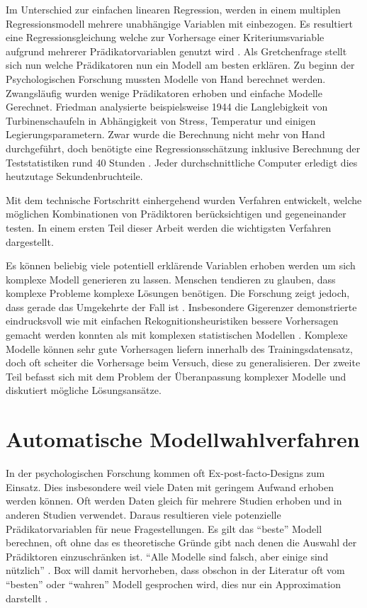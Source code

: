 \documentclass[english,12pt,doc]{apa}
\begin{document}
Im Unterschied zur einfachen linearen Regression, werden in einem multiplen Regressionsmodell mehrere unabhängige Variablen mit einbezogen. 
Es resultiert eine Regressionsgleichung welche zur Vorhersage einer Kriteriumsvariable aufgrund mehrerer Prädikatorvariablen genutzt wird  \cite[S. 448]{bortz2011}. 
Als Gretchenfrage stellt sich nun welche Prädikatoren nun ein Modell am besten erklären. 
Zu beginn der Psychologischen Forschung mussten Modelle von Hand berechnet werden. Zwangsläufig wurden wenige Prädikatoren erhoben und einfache Modelle Gerechnet. 
Friedman analysierte beispielsweise 1944 die Langlebigkeit von Turbinenschaufeln in Abhängigkeit von Stress, Temperatur und einigen Legierungsparametern. 
Zwar wurde die Berechnung nicht mehr von Hand durchgeführt, doch benötigte eine Regressionsschätzung inklusive Berechnung der Teststatistiken rund 40 Stunden \cite[p.2]{armstrong2011illusions}. Jeder durchschnittliche Computer erledigt dies heutzutage Sekundenbruchteile. 

Mit dem technische Fortschritt einhergehend wurden Verfahren entwickelt, welche möglichen Kombinationen von Prädiktoren berücksichtigen und gegeneinander testen. 
In einem ersten Teil dieser Arbeit werden die wichtigsten Verfahren dargestellt. 

Es können beliebig viele potentiell erklärende Variablen erhoben werden um sich komplexe Modell generieren zu lassen. 
Menschen tendieren zu glauben, dass komplexe Probleme komplexe Lösungen benötigen. 
Die Forschung zeigt jedoch, dass gerade das Umgekehrte der Fall ist \cite[p.3]{armstrong2011illusions}. 
Insbesondere Gigerenzer demonstrierte eindrucksvoll wie mit einfachen Rekognitionsheuristiken bessere Vorhersagen gemacht werden konnten als mit komplexen statistischen Modellen \cite{borges1999can}.
Komplexe Modelle können sehr gute Vorhersagen liefern innerhalb des Trainingsdatensatz, doch oft scheiter die Vorhersage beim Versuch, diese zu generalisieren. 
Der zweite Teil befasst sich mit dem Problem der Überanpassung komplexer Modelle und diskutiert mögliche Lösungsansätze.

\section{Automatische Modellwahlverfahren}
In der psychologischen Forschung kommen oft Ex-post-facto-Designs zum Einsatz. 
Dies insbesondere weil viele Daten mit geringem Aufwand erhoben werden können. Oft werden  Daten gleich für mehrere Studien erhoben und in anderen Studien verwendet. 
Daraus resultieren viele potenzielle Prädikatorvariablen für neue Fragestellungen. 
Es gilt das ``beste'' Modell berechnen, oft ohne das es theoretische Gründe gibt nach denen die Auswahl der Prädiktoren einzuschränken ist.
``Alle Modelle sind falsch, aber einige sind nützlich'' \cite[p.202]{box1979robustness}.
Box will damit hervorheben, dass obschon in der Literatur oft vom ``besten'' oder ``wahren'' Modell gesprochen wird, dies nur ein Approximation darstellt \cite[p.172]{weakliem2004introduction}. 
\end{document}
